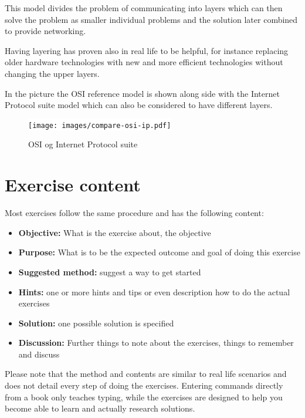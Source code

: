 \documentclass[a4paper,11pt,notitlepage]{report}
\begin{document}
This model divides the problem of communicating into layers which can
then solve the problem as smaller individual problems and the solution
later combined to provide networking.

Having layering has proven also in real life to be helpful, for instance
replacing older hardware technologies with new and more efficient technologies
without changing the upper layers.

In the picture the OSI reference model is shown along side with
the Internet Protocol suite model which can also be considered to have different layers.


\begin{figure}[H]
\label{fig:osi}
\begin{center}
\colorbox{white}{\texttt{[image: images/compare-osi-ip.pdf]}}
\end{center}
\caption{OSI og Internet Protocol suite}
\end{figure}


\chapter*{\color{titlecolor}Exercise content}

Most exercises follow the same procedure and has the following content:
\begin{itemize}
\item {\bf Objective:} What is the exercise about, the objective
\item {\bf Purpose:} What is to be the expected outcome and goal of doing this exercise
\item {\bf Suggested method:} suggest a way to get started
\item {\bf Hints:} one or more hints and tips or even description how to
do the actual exercises
\item {\bf Solution:} one possible solution is specified
\item {\bf Discussion:} Further things to note about the exercises, things to remember and discuss
\end{itemize}

Please note that the method and contents are similar to real life scenarios and does not detail every step of doing the exercises. Entering commands directly from a book only teaches typing, while the exercises are designed to help you become able to learn and actually research solutions.
\end{document}
